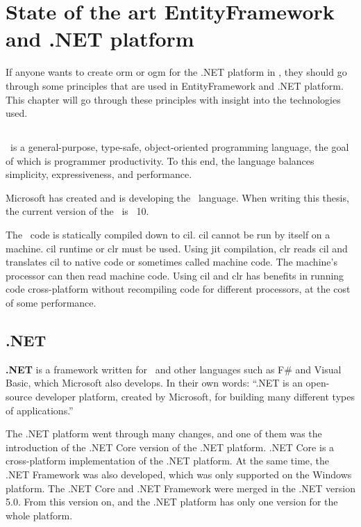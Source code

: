 \chapter {State of the art EntityFramework and .NET platform}

If anyone wants to create \acrshort{orm} or \acrshort{ogm} for the .NET platform in \CS, they should go through some principles that are used in EntityFramework and .NET platform.
This chapter will go through these principles with insight into the technologies used.

\section {\CS}
\CS\ is a general-purpose, type-safe, object-oriented programming language, the goal of which is programmer productivity.
To this end, the language balances simplicity, expressiveness, and performance. \cite{albahari_c_2019}

Microsoft has created and is developing the \CS\ language. When writing this thesis, the current version of the \CS\ is \CS\ 10.

The \CS\ code is statically compiled down to \acrlong{cil}. \acrshort{cil} cannot be run by itself on a machine.
\acrshort{cil} runtime or \acrfull{clr} must be used.
Using \acrfull{jit} compilation, \acrshort{clr} reads \acrshort{cil} and translates \acrshort{cil} to native code or sometimes called machine code.
The machine's processor can then read machine code. Using \acrshort{cil} and \acrshort{clr} has benefits in running code cross-platform without recompiling code for different processors, at the cost of some performance. \cite{rodenburg_code_2021}

\section {.NET}

\textbf{.NET} is a framework written for \CS\ and other languages such as F\# and Visual Basic, which Microsoft also develops.
In their own words: ``.NET is an open-source developer platform, created by Microsoft, for building many different types of applications.'' \cite{microsoft_what_nodate}

The .NET platform went through many changes, and one of them was the introduction of the .NET Core version of the .NET platform.
.NET Core is a cross-platform implementation of the .NET platform. At the same time, the .NET Framework was also developed, which was only supported on the Windows platform.
The .NET Core and .NET Framework were merged in the .NET version 5.0.
From this version on, and the .NET platform has only one version for the whole platform.

